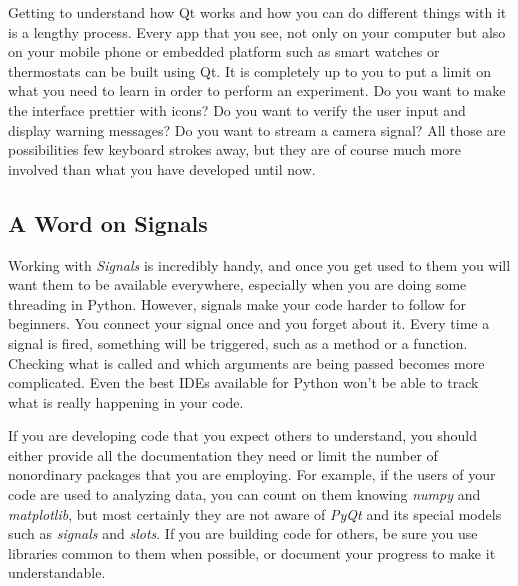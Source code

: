 Getting to understand how Qt works and how you can do different things
with it is a lengthy process. Every app that you see, not only on your
computer but also on your mobile phone or embedded platform such as
smart watches or thermostats can be built using Qt. It is completely up
to you to put a limit on what you need to learn in order to perform an
experiment. Do you want to make the interface prettier with icons? Do
you want to verify the user input and display warning messages? Do you
want to stream a camera signal? All those are possibilities few keyboard
strokes away, but they are of course much more involved than what you
have developed until now.

\subsection{A Word on Signals}\label{a-word-onsignals}
Working with \emph{Signals} is incredibly handy, and once you get used
to them you will want them to be available everywhere, especially when
you are doing some threading in Python. However, signals make your code
harder to follow for beginners. You connect your signal once and you
forget about it. Every time a signal is fired, something will be
triggered, such as a method or a function. Checking what is called and
which arguments are being passed becomes more complicated. Even the best
IDEs available for Python won't be able to track what is really
happening in your code.

If you are developing code that you expect others to understand, you
should either provide all the documentation they need or limit the number of nonordinary packages that you are employing. For example, if
the users of your code are used to analyzing data, you can count on them
knowing \emph{numpy} and \emph{matplotlib}, but most certainly they are
not aware of \emph{PyQt} and its special models such as \emph{signals}
and \emph{slots}. If you are building code for others, be sure you use
libraries common to them when possible, or document your progress to
make it understandable.

